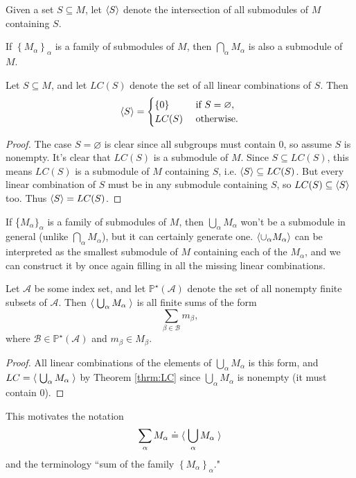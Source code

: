 \documentclass[twoside,10pt]{report}
\begin{document}
\begin{defn}[]
Given a set $S \subseteq M$, let $\langle S \rangle$ denote the intersection of all submodules of $M$ containing $S$.
\end{defn}

\begin{prop}
If $\left\{ M_{\alpha} \right\}_{\alpha}$ is a family of submodules of $M$, then $\bigcap_{\alpha}M_{\alpha}$ is also a submodule of $M$.
\end{prop}

\begin{thrm}[]
	\label{thrm:LC}
	Let $S \subseteq M$, and let $LC(S)$ denote the set of all linear combinations of $S$. Then
	\[
	\langle S \rangle=
	\begin{cases}
		\left\{ 0 \right\} & \text{ if } S = \varnothing,\\
		LC(S) & \text{ otherwise}.
	\end{cases}
	\] 
\end{thrm}
\begin{proof}
	The case $S = \varnothing$ is clear since all subgroups must contain 0, so assume $S$ is nonempty. It's clear that $LC(S)$ is a submodule of $M$. Since $S \subseteq LC(S)$, this means $LC(S)$ is a submodule of $M$ containing $S$, i.e. $\langle S \rangle \subseteq LC(S)$. But every linear combination of $S$ must be in any submodule containing $S$, so $LC(S) \subseteq \langle S \rangle$ too. Thus $\langle S \rangle= LC(S)$.
\end{proof}

If \{$M_{\alpha}\}_{\alpha}$ is a family of submodules of $M$, then $\bigcup_{\alpha}M_{\alpha}$ won't be a submodule in general (unlike $\bigcap_{\alpha}M_\alpha$), but it can certainly generate one. $\langle \cup_{\alpha}M_{\alpha} \rangle$ can be interpreted as the smallest submodule of $M$ containing each of the $M_{\alpha}$, and we can construct it by once again filling in all the missing linear combinations.

\begin{prop}
	Let $\mathcal{A}$ be some index set, and let $\mathbb{P}^{\star}(\mathcal{A})$ denote the set of all nonempty finite subsets of $\mathcal{A}$. Then $\left\langle \;\bigcup_{\alpha}M_{\alpha}\; \right\rangle$ is all finite sums of the form
	\[
	\sum_{\beta \in \mathcal{B}} m_{\beta},
	\] where $\mathcal{B} \in \mathbb{P}^{\star}(\mathcal{A})$ and $m_{\beta} \in M_{\beta}$.
\end{prop}
\begin{proof}
	All linear combinations of the elements of $\bigcup_{\alpha}M_{\alpha}$ is this form, and $LC = \left\langle \;\bigcup_{\alpha}M_{\alpha}\; \right\rangle$ by Theorem \ref{thrm:LC} since $\bigcup_{\alpha}M_{\alpha}$ is nonempty (it must contain 0).
\end{proof}
This motivates the notation
\[
\sum_{\alpha}M_{\alpha} \doteq \langle \; \bigcup_{\alpha}M_{\alpha}\; \rangle
\] 
and the terminology ``sum of the family $\left\{ M_{\alpha} \right\}_{\alpha}$."
\end{document}
